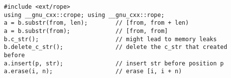 \begin{lstlisting}
#include <ext/rope>
using __gnu_cxx::crope; using __gnu_cxx::rope;
a = b.substr(from, len);        // [from, from + len)
a = b.substr(from);             // [from, from]
b.c_str();                      // might lead to memory leaks
b.delete_c_str();               // delete the c_str that created before
a.insert(p, str);               // insert str before position p
a.erase(i, n);                  // erase [i, i + n)
\end{lstlisting}
